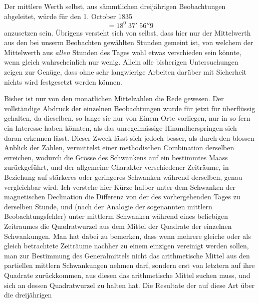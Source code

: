 Der mittlere Werth selbst, aus sämmtlichen dreijährigen Beobachtungen abgeleitet, würde für den 1. October 1835
\[
=18^0\;37'\;56''9
\]
anzusetzen sein. Übrigens versteht sich von selbst, dass hier nur der Mittelwerth aus den bei unserm Beobachten gewählten Stunden gemeint ist, von welchem der Mittelwerth aus \textit{allen} Stunden des Tages wohl etwas verschieden sein könnte, wenn gleich wahrscheinlich nur wenig. Allein alle bisherigen Untersuchungen zeigen zur Genüge, dass ohne sehr langwierige Arbeiten darüber mit Sicherheit nichts wird festgesetzt werden können.

Bisher ist nur von den monatlichen Mittelzahlen die Rede gewesen. Der vollständige Abdruck der einzelnen Beobachtungen wurde für jetzt für überflüssig gehalten, da dieselben, so lange sie nur von Einem Orte vorliegen, nur in so fern ein Interesse haben könnten, als das unregelmässige Hinundherspringen sich daran erkennen lässt. Dieser Zweck lässt sich jedoch besser, als durch den blossen Anblick der Zahlen, vermittelst einer methodischen Combination derselben erreichen, wodurch die Grösse des Schwankens auf ein bestimmtes Maass zurückgeführt, und der allgemeine Charakter verschiedener Zeiträume, in Beziehung auf stärkeres oder geringeres Schwanken während derselben, genau vergleichbar wird. Ich verstehe hier Kürze halber unter dem Schwanken der magnetischen Declination die Differenz von der des vorhergehenden Tages zu derselben Stunde, und (nach der Analogie der sogenannten mittlern Beobachtungsfehler) unter mittlerm Schwanken während eines beliebigen Zeitraumes die Quadratwurzel aus dem Mittel der Quadrate der einzelnen Schwankungen. Man hat dabei zu bemerken, dass wenn mehrere gleiche oder als gleich betrachtete Zeiträume nachher zu einem einzigen vereinigt werden sollen, man zur Bestimmung des Generalmittels nicht das arithmetische Mittel aus den partiellen mittlern Schwankungen nehmen darf, sondern erst von letztern auf ihre Quadrate zurückkommen, aus diesen das arithmetische Mittel suchen muss, und sich an dessen Quadratwurzel zu halten hat. Die Resultate der auf diese Art über die dreijährigen
